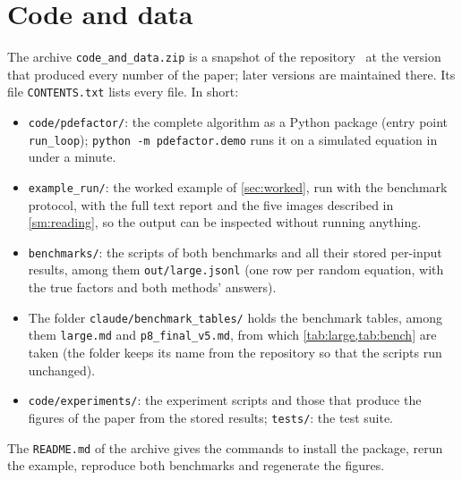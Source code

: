 \section{Code and data}\label{sm:code}
The archive \texttt{code\_and\_data.zip} is a snapshot of the repository~\cite{Pri26code} at the version that produced
every number of the paper; later versions are maintained there. Its file \texttt{CONTENTS.txt} lists every file. In short:
\begin{itemize}
\item \texttt{code/pdefactor/}: the complete algorithm as a Python package (entry point \texttt{run\_loop});
\texttt{python -m pdefactor.demo} runs it on a simulated equation in under a minute.
\item \texttt{example\_run/}: the worked example of \cref{sec:worked}, run with the benchmark protocol, with the full
text report and the five images described in \cref{sm:reading}, so the output can be inspected without running anything.
\item \texttt{benchmarks/}: the scripts of both benchmarks and all their stored per-input results, among them
\texttt{out/large.jsonl} (one row per random equation, with the true factors and both methods' answers).
\item The folder \texttt{claude/\allowbreak benchmark\_tables/} holds the benchmark tables, among them \texttt{large.md} and
\texttt{p8\_final\_v5.md}, from which \cref{tab:large,tab:bench} are taken (the folder keeps its name from the
repository so that the scripts run unchanged).
\item \texttt{code/experiments/}: the experiment scripts and those that produce the figures of the paper from the
stored results; \texttt{tests/}: the test suite.
\end{itemize}
The \texttt{README.md} of the archive gives the commands to install the package, rerun the example, reproduce both
benchmarks and regenerate the figures.

